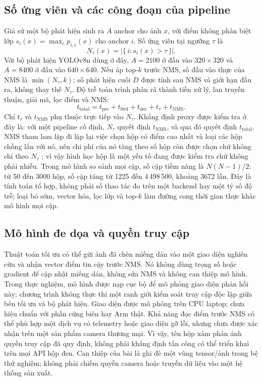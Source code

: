 \documentclass[a4paper,fleqn]{cas-dc}
\newcommand{\Ntau}{N_{\tau}}
\begin{document}
\subsection{Số ứng viên và các công đoạn của pipeline}
Giả sử một bộ phát hiện sinh ra $A$ anchor cho ảnh $x$, với điểm không phân biệt lớp $s_i(x)=\max_c p_{i,c}(x)$ cho anchor $i$. Số ứng viên tại ngưỡng $\tau$ là
\begin{equation}
\Ntau(x)=\bigl|\{\, i : s_i(x) > \tau \,\}\bigr| .
\end{equation}
Với bộ phát hiện YOLOv8n dùng ở đây, $A=2100$ ở đầu vào $320\times320$ và $A=8400$ ở đầu vào $640\times640$. Nếu áp top-$k$ trước NMS, số đầu vào thực của NMS là $\min(\Ntau,k)$; số phát hiện cuối $D$ được tính sau NMS và giới hạn đầu ra, không thay thế $\Ntau$. Độ trễ toàn trình phân rã thành tiền xử lý, lan truyền thuận, giải mã, lọc điểm và NMS:
\begin{equation}
t_{\mathrm{total}} = t_{\mathrm{pre}} + t_{\mathrm{fwd}} + t_{\mathrm{dec}} + t_{\tau} + t_{\mathrm{NMS}} .
\end{equation}
Chỉ $t_{\tau}$ và $t_{\mathrm{NMS}}$ phụ thuộc trực tiếp vào $\Ntau$. Khẳng định proxy được kiểm tra ở đây là: với một pipeline cố định, $\Ntau$ quyết định $t_{\mathrm{NMS}}$, và qua đó quyết định $t_{\mathrm{total}}$. NMS tham lam lặp đi lặp lại việc chọn hộp có điểm cao nhất và loại các hộp chồng lấn với nó, nên chi phí của nó tăng theo số hộp còn được chọn chứ không chỉ theo $\Ntau$ \cite{neubeck2006nms}; vì vậy hình học hộp là một yếu tố đang được kiểm tra chứ không phải nhiễu. Trong mô hình so sánh mọi cặp, số cặp tiềm năng là $N(N-1)/2$: từ 50 đến 3000 hộp, số cặp tăng từ 1225 đến 4\,498\,500, khoảng 3672 lần. Đây là tính toán tổ hợp, không phải số thao tác đo trên một backend hay một tỷ số độ trễ; loại bỏ sớm, vector hóa, lọc lớp và top-$k$ làm đường cong thời gian thực khác mô hình mọi cặp.

\subsection{Mô hình đe dọa và quyền truy cập}
Thuật toán tối ưu có thể gửi ảnh đã chèn miếng dán vào một giao diện nghiên cứu và nhận vector điểm tin cậy trước NMS. Nó không dùng trọng số hoặc gradient để cập nhật miếng dán, không sửa NMS và không can thiệp mô hình. Trong thực nghiệm, mô hình được nạp cục bộ để mô phỏng giao diện phản hồi này; chương trình không thực thi một ranh giới kiểm soát truy cập độc lập giữa bên tối ưu và bộ phát hiện. Giao diện được mô phỏng trên CPU laptop; chưa hiệu chuẩn với phần cứng biên hay Arm thật. Khả năng đọc điểm trước NMS có thể phù hợp một dịch vụ có telemetry hoặc giao diện gỡ lỗi, nhưng chưa được xác nhận trên một sản phẩm camera thương mại. Vì vậy, tên hộp xám phản ánh quyền truy cập đã quy định, không phải khẳng định tấn công có thể triển khai trên mọi API hộp đen. Can thiệp của bài là ghi đè một vùng tensor/ảnh trong bệ thử nghiệm; không phải chiếm quyền camera hoặc truyền dữ liệu vào một hệ thống sản xuất.
\end{document}
